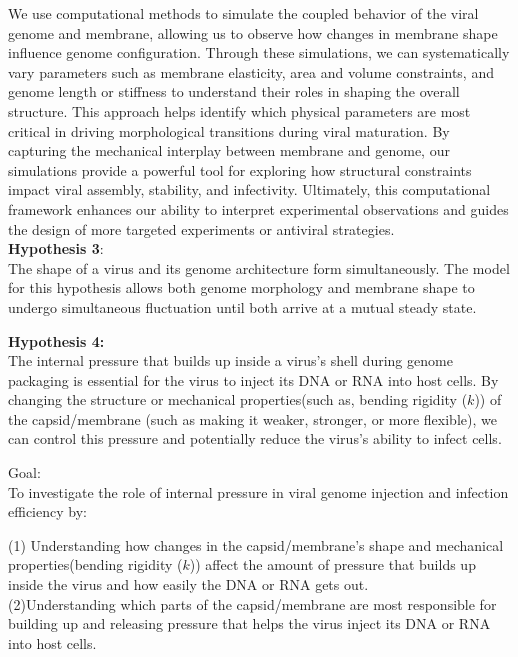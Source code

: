 \documentclass[12pt]{article}
\begin{document}
\begin{flushleft}
We use computational methods to simulate the coupled behavior of the viral genome and membrane, allowing us to observe how changes in membrane shape influence genome configuration. Through these simulations, we can systematically vary parameters such as membrane elasticity, area and volume constraints, and genome length or stiffness to understand their roles in shaping the overall structure. This approach helps identify which physical parameters are most critical in driving morphological transitions during viral maturation. By capturing the mechanical interplay between membrane and genome, our simulations provide a powerful tool for exploring how structural constraints impact viral assembly, stability, and infectivity. Ultimately, this computational framework enhances our ability to interpret experimental observations and guides the design of more targeted experiments or antiviral strategies.\\

\noindent \textbf{Hypothesis 3}:\\
The shape of a virus and its genome architecture form simultaneously.
The model for this hypothesis allows both genome morphology and membrane shape to undergo simultaneous
fluctuation until both arrive at a mutual steady state.

	
\noindent \textbf{Hypothesis 4:}\\
The internal pressure that builds up inside a virus’s shell during genome packaging is essential for the virus to inject its DNA or RNA into host cells. By changing the structure or mechanical properties(such as, bending rigidity ($k$)) of the capsid/membrane (such as making it weaker, stronger, or more flexible), we can control this pressure and potentially reduce the virus’s ability to infect cells.

\noindent Goal:\\
\noindent To investigate the role of internal pressure in viral genome injection and infection efficiency by:

\noindent (1) Understanding how changes in the capsid/membrane's shape and mechanical properties(bending rigidity ($k$)) affect the amount of pressure that builds up inside the virus and how easily the DNA or RNA gets out.\\

\noindent (2)Understanding which parts of the capsid/membrane are most responsible for building up and releasing pressure that helps the virus inject its DNA or RNA into host cells.\\


\end{flushleft}
\end{document}
